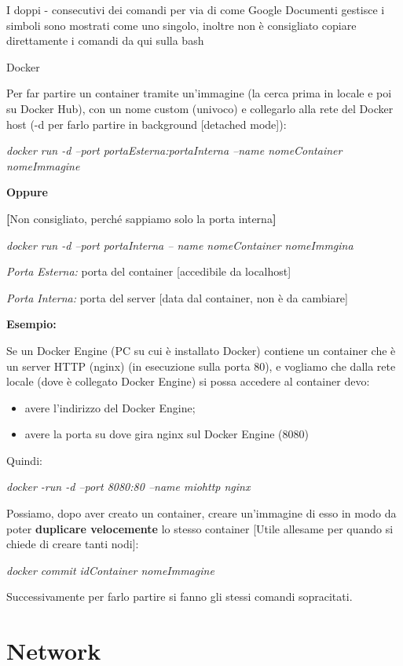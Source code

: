 I doppi - consecutivi dei comandi per via di come Google Documenti
gestisce i simboli sono mostrati come uno singolo, inoltre non è
consigliato copiare direttamente i comandi da qui sulla bash

Docker

Per far partire un container tramite un'immagine (la cerca prima in
locale e poi su Docker Hub), con un nome custom (univoco) e collegarlo
alla rete del Docker host (-d per farlo partire in background
{[}detached mode{]}):

\emph{docker run -d --port portaEsterna:portaInterna --name
nomeContainer nomeImmagine}

\textbf{Oppure}

\textbf{{[}}Non consigliato, perché sappiamo solo la porta
interna\textbf{{]}}

\emph{docker run -d --port portaInterna -- name nomeContainer
nomeImmgina}

\emph{Porta Esterna:} porta del container {[}accedibile da localhost{]}

\emph{Porta Interna:} porta del server {[}data dal container, non è da
cambiare{]}

\textbf{Esempio:}

Se un Docker Engine (PC su cui è installato Docker) contiene un
container che è un server HTTP (nginx) (in esecuzione sulla porta 80), e
vogliamo che dalla rete locale (dove è collegato Docker Engine) si possa
accedere al container devo:

\begin{itemize}
\item
  avere l'indirizzo del Docker Engine;
\item
  avere la porta su dove gira nginx sul Docker Engine (8080)
\end{itemize}

Quindi:

\emph{docker -run -d --port 8080:80 --name miohttp nginx}

Possiamo, dopo aver creato un container, creare un'immagine di esso in
modo da poter \textbf{duplicare velocemente} lo stesso container
{[}Utile all\textquotesingle esame per quando si chiede di creare tanti
nodi{]}:

\emph{docker commit idContainer nomeImmagine}

Successivamente per farlo partire si fanno gli stessi comandi
sopracitati.

\section{Network}\label{network}

